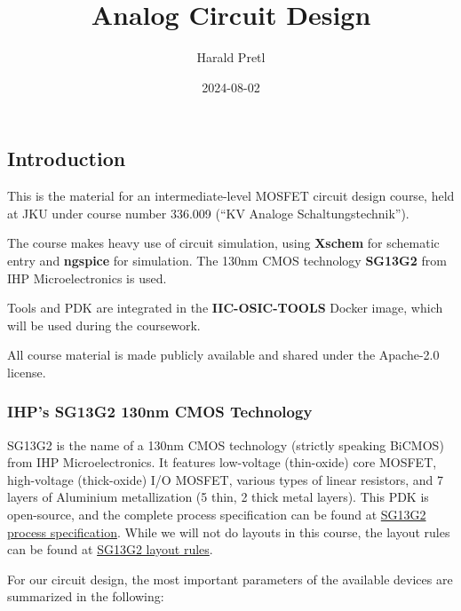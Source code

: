 \documentclass[
  a4paper,
  DIV=11,
  numbers=noendperiod]{scrartcl}
\title{Analog Circuit Design}
\author{Harald Pretl}
\date{2024-08-02}
\renewcommand*\contentsname{Table of contents}
\newcommand\contentsname{Table of contents}
\begin{document}
\maketitle

\renewcommand*\contentsname{Table of contents}
{
\hypersetup{linkcolor=}
\setcounter{tocdepth}{3}
\tableofcontents
}

\subsection{Introduction}\label{sec-intro}

This is the material for an intermediate-level MOSFET circuit design
course, held at JKU under course number 336.009 (``KV Analoge
Schaltungstechnik'').

The course makes heavy use of circuit simulation, using \textbf{Xschem}
for schematic entry and \textbf{ngspice} for simulation. The 130nm CMOS
technology \textbf{SG13G2} from IHP Microelectronics is used.

Tools and PDK are integrated in the \textbf{IIC-OSIC-TOOLS} Docker
image, which will be used during the coursework.

All course material is made publicly available and shared under the
Apache-2.0 license.

\subsubsection{IHP's SG13G2 130nm CMOS
Technology}\label{ihps-sg13g2-130nm-cmos-technology}

SG13G2 is the name of a 130nm CMOS technology (strictly speaking BiCMOS)
from IHP Microelectronics. It features low-voltage (thin-oxide) core
MOSFET, high-voltage (thick-oxide) I/O MOSFET, various types of linear
resistors, and 7 layers of Aluminium metallization (5 thin, 2 thick
metal layers). This PDK is open-source, and the complete process
specification can be found at
\href{https://github.com/IHP-GmbH/IHP-Open-PDK/blob/main/ihp-sg13g2/libs.doc/doc/SG13G2_os_process_spec.pdf}{SG13G2
process specification}. While we will not do layouts in this course, the
layout rules can be found at
\href{https://github.com/IHP-GmbH/IHP-Open-PDK/blob/main/ihp-sg13g2/libs.doc/doc/SG13G2_os_layout_rules.pdf}{SG13G2
layout rules}.

For our circuit design, the most important parameters of the available
devices are summarized in the following:
\end{document}
